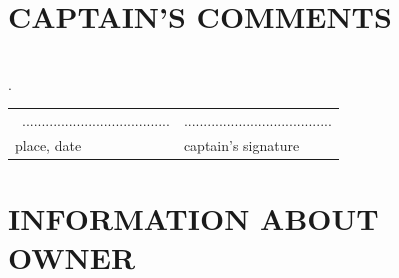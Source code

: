 \documentclass{article}
\begin{document}
    
\section*{CAPTAIN'S COMMENTS}


\textit{}\dotfill \\
.\dotfill \\
\begin{tabularx}{\textwidth}{X X}
\\\
...................................... & ......................................\\
place, date & captain's signature\\
\end{tabularx}
\section*{INFORMATION ABOUT OWNER}
\end{document}
